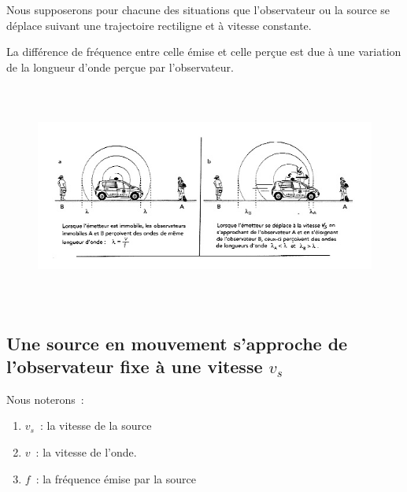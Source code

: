 Nous supposerons pour chacune des situations que l'observateur ou la
source se déplace suivant une trajectoire rectiligne et à vitesse
constante.

La différence de fréquence entre celle émise et celle perçue est due à
une variation de la longueur d'onde perçue par l'observateur.

\begin{figure}
\centering
\includegraphics[width=16.611cm,height=7.362cm]{Pictures/1000000100000234000000FA4BFBBF5E6B58FB9F.png}
\caption{}
\end{figure}

\subsection{Une source en mouvement s'approche de l'observateur fixe à une vitesse $v_s$}

Nous noterons~:
\begin{enumerate}
	\item $v_s$~: la vitesse de la source
	\item $v$~: la vitesse de l'onde.
	\item $f$~: la fréquence émise par la source
\end{enumerate}

